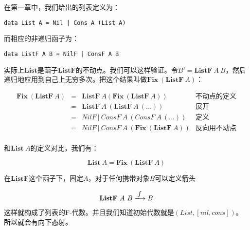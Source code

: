 \documentclass{article}
\begin{document}
\begin{example}
在第一章中，我们给出的列表定义为：

\lstset{frame=none}
\begin{lstlisting}
data List A = Nil | Cons A (List A)
\end{lstlisting}

而相应的非递归函子为：

\begin{lstlisting}
data ListF A B = NilF | ConsF A B
\end{lstlisting}

实际上$\mathbf{List}$是函子$\mathbf{ListF}$的不动点。我们可以这样验证。令$B' = \mathbf{ListF}\ A\ B$，然后递归地应用到自己上无穷多次。把这个结果叫做$\mathbf{Fix}\ (\mathbf{ListF}\ A)$：

\[
\begin{array}{rcll}
\mathbf{Fix}\ (\mathbf{ListF}\ A)
& = & \mathbf{ListF}\ A (\mathbf{Fix}\ (\mathbf{ListF}\ A)) & \text{不动点的定义} \\
& = & \mathbf{ListF}\ A\ (\mathbf{ListF}\ A\ (...)) & \text{展开} \\
& = & NilF\ |\ ConsF\ A\ (ConsF\ A\ (...)) & \text{定义} \\
& = & NilF\ |\ ConsF\ A\ (\mathbf{Fix}\ (\mathbf{ListF}\ A)) & \text{反向用不动点} \\
\end{array}
\]

和$\mathbf{List}\ A$的定义对比，我们有：

\[
\mathbf{List}\ A = \mathbf{Fix}\ (\mathbf{ListF}\ A)
\]

在$\mathbf{ListF}$这个函子下，固定$A$，对于任何携带对象$B$可以定义箭头

\[
\mathbf{ListF}\ A\ B \arrowto{f} B
\]

这样就构成了列表的F-代数。并且我们知道初始代数就是$(List, [nil, cons])$。所以就会有向下态射。

\begin{center}
\end{center}


\end{example}
\end{document}
